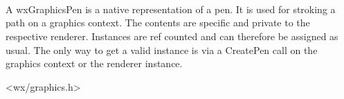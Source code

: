 
\section{}\label{wxgraphicspen}


\\

A wxGraphicsPen is a native representation of a pen. It is used for stroking a path on a graphics context. The contents are specific and private to the respective renderer. Instances are ref counted and can therefore be assigned as usual. The only way to get a valid instance is via a CreatePen call on the graphics context or the renderer instance.


<wx/graphics.h>



